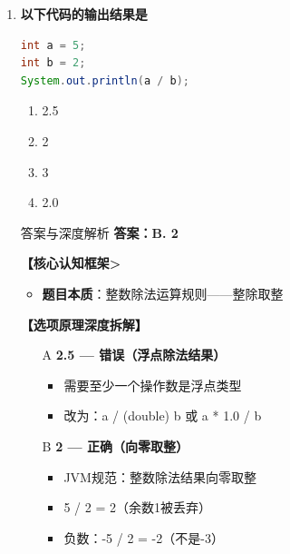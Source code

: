 \documentclass[12pt, a4paper]{ctexart}
\begin{document}
\begin{enumerate}[label=\textbf{\arabic*.}]
\begin{bluebox}{答案与深度解析}
		      \textbf{【应背诵知识点>}
		      \begin{itemize}[label={}, nosep]
			      \item 整数类型：byte(8位)、short(16位)、int(32位)、long(64位)
			      \item 浮点类型：float(32位)、double(64位)
			      \item 默认：整数默认int，浮点默认double
		      \end{itemize}
	      \end{bluebox}

	      \vspace{1em}

	\item \textbf{以下代码的输出结果是}
	      \begin{lstlisting}[language=Java]
int a = 5;
int b = 2;
System.out.println(a / b);
	      \end{lstlisting}
	      \begin{enumerate}[label=\Alph*.]
		      \item 2.5
		      \item 2
		      \item 3
		      \item 2.0
	      \end{enumerate}

	      \begin{bluebox}{答案与深度解析}
		      \textbf{答案：B. 2}

		      \textbf{【核心认知框架>}
		      \begin{itemize}[label={}, leftmargin=*, nosep]
			      \item \textbf{题目本质}：整数除法运算规则——整除取整
		      \end{itemize}

		      \textbf{【选项原理深度拆解】}

		      \begin{itemize}[leftmargin=*, nosep, label={}]
			      \item[A] \textbf{2.5 — 错误（浮点除法结果）}
			      \begin{itemize}[label={}, nosep]
				      \item 需要至少一个操作数是浮点类型
				      \item 改为：a / (double) b 或 a * 1.0 / b
			      \end{itemize}

			      \item[B] \textbf{2 — 正确（向零取整）}
			      \begin{itemize}[label={}, nosep]
				      \item JVM规范：整数除法结果向零取整
				      \item 5 / 2 = 2（余数1被丢弃）
				      \item 负数：-5 / 2 = -2（不是-3）
			      \end{itemize}


\end{itemize}
\end{bluebox}
\end{enumerate}
\end{document}
